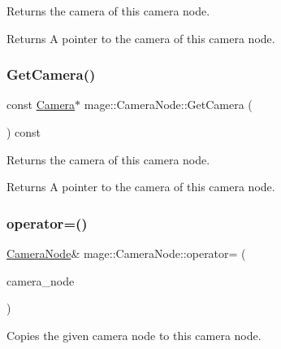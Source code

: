 Returns the camera of this camera node.

\begin{DoxyReturn}{Returns}
A pointer to the camera of this camera node. 
\end{DoxyReturn}
\hypertarget{classmage_1_1_camera_node_aa911263cfce8cec2a42c6d03d25af606}{}\label{classmage_1_1_camera_node_aa911263cfce8cec2a42c6d03d25af606} 
\subsubsection{\texorpdfstring{Get\+Camera()}{GetCamera()}\hspace{0.1cm}{\footnotesize\ttfamily [2/2]}}
{\footnotesize\ttfamily const \hyperlink{classmage_1_1_camera}{Camera}$\ast$ mage\+::\+Camera\+Node\+::\+Get\+Camera (\begin{DoxyParamCaption}{ }\end{DoxyParamCaption}) const\hspace{0.3cm}{\ttfamily [noexcept]}}

Returns the camera of this camera node.

\begin{DoxyReturn}{Returns}
A pointer to the camera of this camera node. 
\end{DoxyReturn}
\hypertarget{classmage_1_1_camera_node_a03442d51e4279717f6692e0a731967a1}{}\label{classmage_1_1_camera_node_a03442d51e4279717f6692e0a731967a1} 
\subsubsection{\texorpdfstring{operator=()}{operator=()}\hspace{0.1cm}{\footnotesize\ttfamily [1/2]}}
{\footnotesize\ttfamily \hyperlink{classmage_1_1_camera_node}{Camera\+Node}\& mage\+::\+Camera\+Node\+::operator= (\begin{DoxyParamCaption}\item[{const \hyperlink{classmage_1_1_camera_node}{Camera\+Node} \&}]{camera\+\_\+node }\end{DoxyParamCaption})\hspace{0.3cm}{\ttfamily [delete]}}

Copies the given camera node to this camera node.


